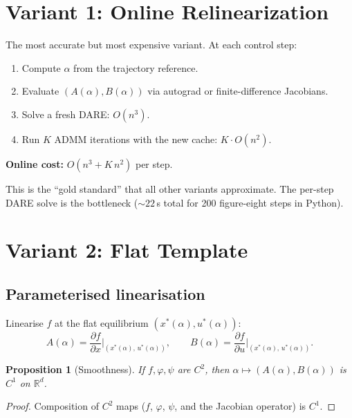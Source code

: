 \documentclass[11pt]{article}
\newtheorem{proposition}[theorem]{Proposition}
\newcommand{\R}{\mathbb{R}}
\begin{document}
\section{Variant 1: Online Relinearization}\label{sec:online-relin}

The most accurate but most expensive variant.
At each control step:
\begin{enumerate}[leftmargin=6mm]
  \item Compute $\alpha$ from the trajectory reference.
  \item Evaluate $(A(\alpha), B(\alpha))$ via autograd or
    finite-difference Jacobians.
  \item Solve a fresh DARE: $O(n^3)$.
  \item Run $K$ ADMM iterations with the new cache: $K \cdot O(n^2)$.
\end{enumerate}

\textbf{Online cost:} $O(n^3 + K\,n^2)$ per step.

This is the ``gold standard'' that all other variants
approximate.
The per-step DARE solve is the bottleneck
(${\sim}22$\,s total for 200 figure-eight steps in Python).

\section{Variant 2: Flat Template}\label{sec:template}

\subsection{Parameterised linearisation}

Linearise $f$ at the flat equilibrium
$(x^*(\alpha), u^*(\alpha))$:
\begin{equation}\label{eq:param-lin}
  A(\alpha) = \frac{\partial f}{\partial x}
    \bigg|_{(x^*(\alpha),\, u^*(\alpha))},
  \qquad
  B(\alpha) = \frac{\partial f}{\partial u}
    \bigg|_{(x^*(\alpha),\, u^*(\alpha))}.
\end{equation}

\begin{proposition}[Smoothness]\label{prop:smooth}
If $f, \varphi, \psi$ are $C^2$, then
$\alpha \mapsto (A(\alpha), B(\alpha))$
is $C^1$ on $\R^d$.
\end{proposition}
\begin{proof}
Composition of $C^2$ maps
($f$, $\varphi$, $\psi$, and the Jacobian operator)
is $C^1$.
\end{proof}
\end{document}
